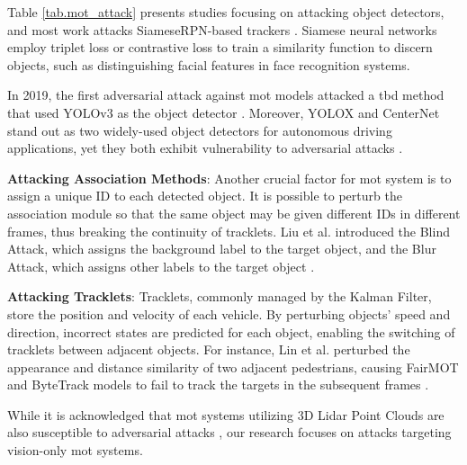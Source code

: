 Table \ref{tab.mot_attack} presents studies focusing on attacking object detectors, and most work attacks SiameseRPN-based trackers  \citep{wu2019sta}. Siamese neural networks employ triplet loss or contrastive loss to train a similarity function to discern objects, such as distinguishing facial features in face recognition systems. 

In 2019, the first adversarial attack against \acrshort{mot} models attacked a \acrshort{tbd} method that used YOLOv3 as the object detector \citep{jia2020fooling}. Moreover, YOLOX \citep{ge2021yolox} and CenterNet \citep{duan2019centernet} stand out as two widely-used object detectors for autonomous driving applications, yet they both exhibit vulnerability to adversarial attacks \citep{zhou2023f,pang2024blinding}.

\textbf{Attacking Association Methods}: Another crucial factor for \acrshort{mot} system is to assign a unique ID to each detected object. It is possible to perturb the association module so that the same object may be given different IDs in different frames, thus breaking the continuity of tracklets. Liu et al. introduced the Blind Attack, which assigns the background label to the target object, and the Blur Attack, which assigns other labels to the target object \citep{liu2022efficient}.


\textbf{Attacking Tracklets}: Tracklets, commonly managed by the Kalman Filter, store the position and velocity of each vehicle. By perturbing objects' speed and direction, incorrect states are predicted for each object, enabling the switching of tracklets between adjacent objects. For instance, Lin et al. perturbed the appearance and distance similarity of two adjacent pedestrians, causing FairMOT and ByteTrack models to fail to track the targets in the subsequent frames \citep{lin2021tracklet}.

While it is acknowledged that \acrshort{mot} systems utilizing 3D Lidar Point Clouds are also susceptible to adversarial attacks \citep{cheng2021universal, cheng2022non, wang2022adversary}, our research focuses on attacks targeting vision-only \acrshort{mot} systems.

\clearpage

